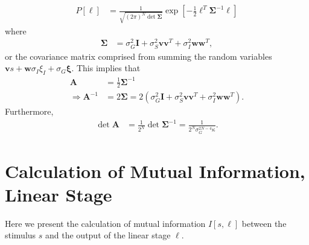 \documentclass[11pt]{article}
\begin{document}
	\begin{align}
		P[\boldsymbol{\ell}] &= \frac{1}{\sqrt{(2\pi)^N \det\boldsymbol{\Sigma}}} \exp\left[-\frac{1}{2} \boldsymbol{\ell}^T \boldsymbol{\Sigma}^{-1} \boldsymbol{\ell}\right]
	\end{align}
	where 
	\begin{align}
		\boldsymbol{\Sigma}&= \sigma_G^2 \mathbf{I} + \sigma_S^2 \mathbf{vv}^T + \sigma_I^2 \mathbf{ww}^T,
	\end{align}
	or the covariance matrix comprised from summing the random variables $\mathbf{v}s+\mathbf{w}\sigma_I\xi_I + \sigma_G\boldsymbol{\xi}$. This implies that 
	\begin{align}
		\mathbf{A} &= \frac{1}{2} \boldsymbol{\Sigma}^{-1} \\
		\Rightarrow \mathbf{A}^{-1} &= 2 \boldsymbol{\Sigma} = 2\left(\sigma_G^2 \mathbf{I} + \sigma_S^2 \mathbf{vv}^T + \sigma_I^2 \mathbf{ww}^T\right).
	\end{align}
	Furthermore, 
	\begin{align}
		\det \mathbf{\mathbf{A}} &= \frac{1}{2^N} \det \boldsymbol{\Sigma}^{-1} = \frac{1}{2^N \sigma_G^{2N-4} \kappa}.
	\end{align}
	\newpage
	
	\section{Calculation of Mutual Information, Linear Stage}
	Here we present the calculation of mutual information $I[s, \boldsymbol{\ell}]$ between the stimulus $s$ and the output of the linear stage $\boldsymbol{\ell}$.
	
\end{document}
